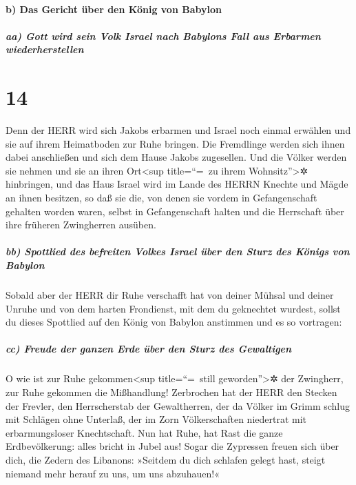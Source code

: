 \hypertarget{b-das-gericht-uxfcber-den-kuxf6nig-von-babylon}{%
\paragraph{b) Das Gericht über den König von
Babylon}\label{b-das-gericht-uxfcber-den-kuxf6nig-von-babylon}}

\hypertarget{aa-gott-wird-sein-volk-israel-nach-babylons-fall-aus-erbarmen-wiederherstellen}{%
\subparagraph{aa) Gott wird sein Volk Israel nach Babylons Fall aus
Erbarmen
wiederherstellen}\label{aa-gott-wird-sein-volk-israel-nach-babylons-fall-aus-erbarmen-wiederherstellen}}

\hypertarget{section-13}{%
\section{14}\label{section-13}}

Denn der HERR wird sich Jakobs erbarmen und Israel noch
einmal erwählen und sie auf ihrem Heimatboden zur Ruhe bringen. Die
Fremdlinge werden sich ihnen dabei anschließen und sich dem Hause Jakobs
zugesellen. Und die Völker werden sie nehmen und sie an
ihren Ort\textless sup title=``=~zu ihrem Wohnsitz''\textgreater✲
hinbringen, und das Haus Israel wird im Lande des HERRN Knechte und
Mägde an ihnen besitzen, so daß sie die, von denen sie vordem in
Gefangenschaft gehalten worden waren, selbst in Gefangenschaft halten
und die Herrschaft über ihre früheren Zwingherren ausüben.

\hypertarget{bb-spottlied-des-befreiten-volkes-israel-uxfcber-den-sturz-des-kuxf6nigs-von-babylon}{%
\subparagraph{bb) Spottlied des befreiten Volkes Israel über den Sturz
des Königs von
Babylon}\label{bb-spottlied-des-befreiten-volkes-israel-uxfcber-den-sturz-des-kuxf6nigs-von-babylon}}

Sobald aber der HERR dir Ruhe verschafft hat von deiner
Mühsal und deiner Unruhe und von dem harten Frondienst, mit dem du
geknechtet wurdest, sollst du dieses Spottlied auf den
König von Babylon anstimmen und es so vortragen:

\hypertarget{cc-freude-der-ganzen-erde-uxfcber-den-sturz-des-gewaltigen}{%
\subparagraph{cc) Freude der ganzen Erde über den Sturz des
Gewaltigen}\label{cc-freude-der-ganzen-erde-uxfcber-den-sturz-des-gewaltigen}}

O wie ist zur Ruhe gekommen\textless sup title=``=~still
geworden''\textgreater✲ der Zwingherr, zur Ruhe gekommen die
Mißhandlung! Zerbrochen hat der HERR den Stecken der
Frevler, den Herrscherstab der Gewaltherren, der da Völker
im Grimm schlug mit Schlägen ohne Unterlaß, der im Zorn Völkerschaften
niedertrat mit erbarmungsloser Knechtschaft. Nun hat Ruhe,
hat Rast die ganze Erdbevölkerung: alles bricht in Jubel aus!
Sogar die Zypressen freuen sich über dich, die Zedern des
Libanons: »Seitdem du dich schlafen gelegt hast, steigt niemand mehr
herauf zu uns, um uns abzuhauen!«

